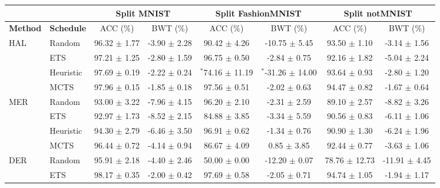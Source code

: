 
\begin{tabular}{llcccccc}
	\toprule
	\textbf{}              & \textbf{}         & \multicolumn{2}{c}{\textbf{Split MNIST}} & \multicolumn{2}{c}{\textbf{Split FashionMNIST}} & \multicolumn{2}{c}{\textbf{Split notMNIST}} \\ \midrule
	\textbf{Method}        & \textbf{Schedule} & ACC (\%)           & BWT (\%)            & ACC (\%)               & BWT (\%)               & ACC (\%)             & BWT (\%)             \\ \midrule
	\multirow{4}{*}{HAL}   & Random            & 96.32 $\pm$ 1.77     & -3.90 $\pm$ 2.28      & 90.42 $\pm$ 4.26         & -10.75 $\pm$ 5.45        & 93.50 $\pm$ 1.10       & -3.14 $\pm$ 1.56       \\
	& ETS               & 97.21 $\pm$ 1.25     & -2.80 $\pm$ 1.59      & 96.75 $\pm$ 0.50         & -2.84 $\pm$ 0.75         & 92.16 $\pm$ 1.82       & -5.04 $\pm$ 2.24       \\
	& Heuristic           & 97.69 $\pm$ 0.19     & -2.22 $\pm$ 0.24      & $^{*}$74.16 $\pm$ 11.19        & $^{*}$-31.26 $\pm$ 14.00       & 93.64 $\pm$ 0.93       & -2.80 $\pm$ 1.20       \\
	& MCTS              & 97.96 $\pm$ 0.15     & -1.85 $\pm$ 0.18      & 97.56 $\pm$ 0.51         & -2.02 $\pm$ 0.63         & 94.47 $\pm$ 0.82       & -1.67 $\pm$ 0.64       \\ \midrule
	\multirow{4}{*}{MER}   & Random            & 93.00 $\pm$ 3.22     & -7.96 $\pm$ 4.15      & 96.20 $\pm$ 2.10         & -2.31 $\pm$ 2.59         & 89.10 $\pm$ 2.57       & -8.82 $\pm$ 3.26       \\
	& ETS               & 92.97 $\pm$ 1.73     & -8.52 $\pm$ 2.15      & 84.88 $\pm$ 3.85         & -3.34 $\pm$ 5.59         & 90.56 $\pm$ 0.83       & -6.11 $\pm$ 1.06       \\
	& Heuristic           & 94.30 $\pm$ 2.79     & -6.46 $\pm$ 3.50      & 96.91 $\pm$ 0.62         & -1.34 $\pm$ 0.76         & 90.90 $\pm$ 1.30       & -6.24 $\pm$ 1.96       \\
	& MCTS              & 96.44 $\pm$ 0.72     & -4.14 $\pm$ 0.94      & 86.67 $\pm$ 4.09         & 0.85 $\pm$ 3.85          & 92.44 $\pm$ 0.77       & -3.63 $\pm$ 1.06       \\ \midrule
	\multirow{4}{*}{DER}   & Random            & 95.91 $\pm$ 2.18     & -4.40 $\pm$ 2.46      & 50.00 $\pm$ 0.00         & -12.20 $\pm$ 0.07        & 78.76 $\pm$ 12.73      & -11.91 $\pm$ 4.45      \\
	& ETS               & 98.17 $\pm$ 0.35     & -2.00 $\pm$ 0.42      & 97.69 $\pm$ 0.58         & -2.05 $\pm$ 0.71         & 94.74 $\pm$ 1.05       & -1.94 $\pm$ 1.17       \\

\end{tabular}

